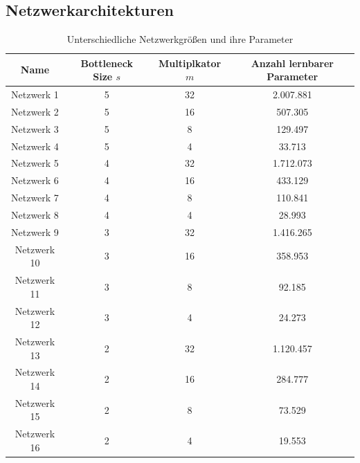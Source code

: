 \chapter{}

\section{Netzwerkarchitekturen}
\begin{table}[H]
    \centering
    \begin{tabular}{ |c|c|c|c| }
        \hline
        \textbf{Name} & \textbf{Bottleneck Size $ s $} & \textbf{Multiplkator $ m $} & \textbf{Anzahl lernbarer Parameter} \\ \hline
        Netzwerk 1 & 5 & 32 & 2.007.881     \\ \hline
        Netzwerk 2 & 5 & 16 & 507.305       \\ \hline
        Netzwerk 3 & 5 & 8  & 129.497       \\ \hline
        Netzwerk 4 & 5 & 4  & 33.713        \\ \hline

        Netzwerk 5 & 4 & 32 & 1.712.073     \\ \hline
        Netzwerk 6 & 4 & 16 & 433.129       \\ \hline
        Netzwerk 7 & 4 & 8  & 110.841       \\ \hline
        Netzwerk 8 & 4 & 4  & 28.993        \\ \hline

        Netzwerk 9  & 3 & 32 & 1.416.265    \\ \hline
        Netzwerk 10 & 3 & 16 & 358.953      \\ \hline
        Netzwerk 11 & 3 & 8  & 92.185       \\ \hline
        Netzwerk 12 & 3 & 4  & 24.273       \\ \hline

        Netzwerk 13 & 2 & 32 & 1.120.457    \\ \hline
        Netzwerk 14 & 2 & 16 & 284.777      \\ \hline
        Netzwerk 15 & 2 & 8  & 73.529       \\ \hline
        Netzwerk 16 & 2 & 4  & 19.553       \\ \hline
    \end{tabular}
    \caption{Unterschiedliche Netzwerkgrößen und ihre Parameter}
    \label{tab:networks}
\end{table}

